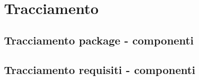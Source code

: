 \section{Tracciamento}

\subsection{Tracciamento package - componenti}
\subsection{Tracciamento requisiti - componenti}
